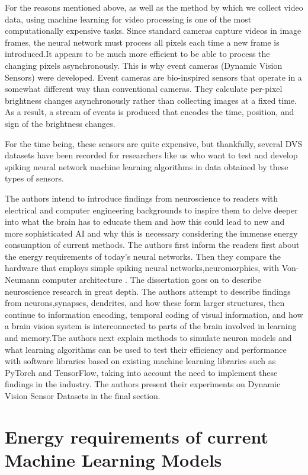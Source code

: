 \documentclass{report}
\begin{document}
For the reasons mentioned above, as well as the method by which we collect video data, using machine learning for video processing is one of the most computationally expensive tasks. Since standard cameras capture videos in image frames, the neural network must process all pixels each time a new frame is introduced.It appears to be much more efficient to be able to process the changing pixels asynchronously. This is why event cameras (Dynamic Vision Sensors) were developed. Event cameras are bio-inspired sensors that operate in a somewhat different way than conventional cameras. They calculate per-pixel brightness changes asynchronously rather than collecting images at a fixed time. As a result, a stream of events is produced that encodes the time, position, and sign of the brightness changes.

For the time being, these sensors are quite expensive, but thankfully, several DVS datasets have been recorded for researchers like us who want to test and develop spiking neural network machine learning algorithms in data obtained by these types of sensors.

The authors intend to introduce findings from neuroscience to readers with electrical and computer engineering backgrounds to inspire them to delve deeper into what the brain has to educate them and how this could lead to new and more sophisticated AI and why this is necessary considering the immense energy consumption of current methods. The authors first inform   the readers first about the energy requirements of today's neural networks. Then they compare the hardware that employs simple spiking neural networks,neuromorphics, with Von-Neumann computer architecture . The dissertation goes on to describe neuroscience research in great depth. The authors attempt to describe findings from neurons,synapses, dendrites, and how these form larger structures, then continue to information encoding, temporal coding of visual information, and how a brain vision system is interconnected to parts of the brain involved in learning and memory.The authors next explain methods to simulate neuron models and what learning algorithms can be used to test their efficiency and performance with software libraries based on existing machine learning libraries such as PyTorch and TensorFlow, taking into account the need to implement these findings in the industry. The authors present their experiments on Dynamic Vision Sensor Datasets in the final section.
\section{Energy requirements of current Machine Learning Models}
\end{document}
